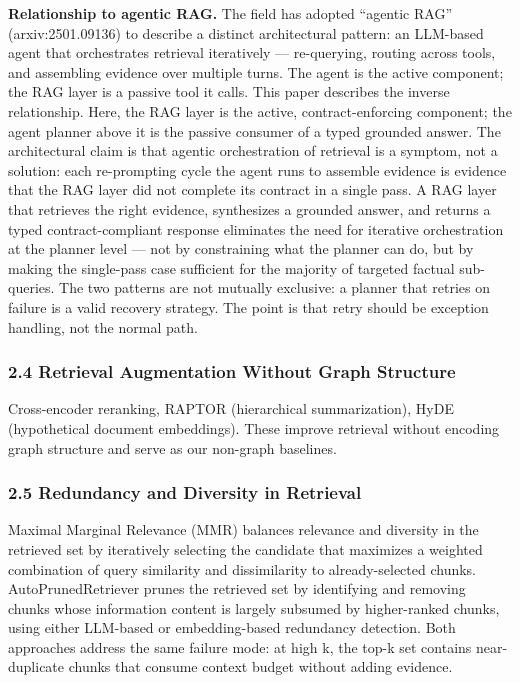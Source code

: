 \documentclass[
]{article}
\begin{document}
\textbf{Relationship to agentic RAG.} The field has adopted ``agentic
RAG'' (arxiv:2501.09136) to describe a distinct architectural pattern:
an LLM-based agent that orchestrates retrieval iteratively ---
re-querying, routing across tools, and assembling evidence over multiple
turns. The agent is the active component; the RAG layer is a passive
tool it calls. This paper describes the inverse relationship. Here, the
RAG layer is the active, contract-enforcing component; the agent planner
above it is the passive consumer of a typed grounded answer. The
architectural claim is that agentic orchestration of retrieval is a
symptom, not a solution: each re-prompting cycle the agent runs to
assemble evidence is evidence that the RAG layer did not complete its
contract in a single pass. A RAG layer that retrieves the right
evidence, synthesizes a grounded answer, and returns a typed
contract-compliant response eliminates the need for iterative
orchestration at the planner level --- not by constraining what the
planner can do, but by making the single-pass case sufficient for the
majority of targeted factual sub-queries. The two patterns are not
mutually exclusive: a planner that retries on failure is a valid
recovery strategy. The point is that retry should be exception handling,
not the normal path.

\subsubsection{2.4 Retrieval Augmentation Without Graph
Structure}\label{retrieval-augmentation-without-graph-structure}

Cross-encoder reranking, RAPTOR (hierarchical summarization), HyDE
(hypothetical document embeddings). These improve retrieval without
encoding graph structure and serve as our non-graph baselines.

\subsubsection{2.5 Redundancy and Diversity in
Retrieval}\label{redundancy-and-diversity-in-retrieval}

Maximal Marginal Relevance (MMR) balances relevance and diversity in the
retrieved set by iteratively selecting the candidate that maximizes a
weighted combination of query similarity and dissimilarity to
already-selected chunks. AutoPrunedRetriever prunes the retrieved set by
identifying and removing chunks whose information content is largely
subsumed by higher-ranked chunks, using either LLM-based or
embedding-based redundancy detection. Both approaches address the same
failure mode: at high k, the top-k set contains near-duplicate chunks
that consume context budget without adding evidence.
\end{document}
